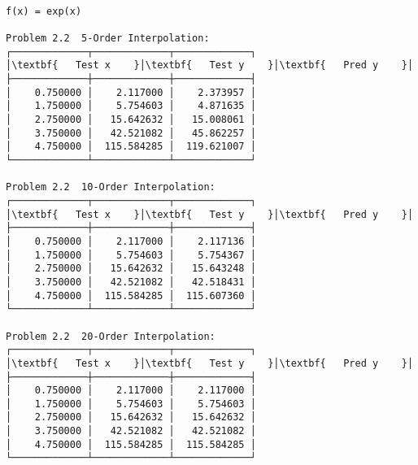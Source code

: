 \documentclass[11pt]{article}
\begin{document}
    \begin{center}
    \end{center}
    { \hspace*{\fill} \\}
    
    \begin{center}
    \end{center}
    { \hspace*{\fill} \\}
    
    \begin{center}
    \end{center}
    { \hspace*{\fill} \\}
    
    \begin{Verbatim}[commandchars=\\\{\}]
f(x) = exp(x)

Problem 2.2  5-Order Interpolation:
┌─────────────┬─────────────┬─────────────┐
│\textbf{   Test x    }│\textbf{   Test y    }│\textbf{   Pred y    }│
├─────────────┼─────────────┼─────────────┤
│    0.750000 │    2.117000 │    2.373957 │
│    1.750000 │    5.754603 │    4.871635 │
│    2.750000 │   15.642632 │   15.008061 │
│    3.750000 │   42.521082 │   45.862257 │
│    4.750000 │  115.584285 │  119.621007 │
└─────────────┴─────────────┴─────────────┘

Problem 2.2  10-Order Interpolation:
┌─────────────┬─────────────┬─────────────┐
│\textbf{   Test x    }│\textbf{   Test y    }│\textbf{   Pred y    }│
├─────────────┼─────────────┼─────────────┤
│    0.750000 │    2.117000 │    2.117136 │
│    1.750000 │    5.754603 │    5.754367 │
│    2.750000 │   15.642632 │   15.643248 │
│    3.750000 │   42.521082 │   42.518431 │
│    4.750000 │  115.584285 │  115.607360 │
└─────────────┴─────────────┴─────────────┘

Problem 2.2  20-Order Interpolation:
┌─────────────┬─────────────┬─────────────┐
│\textbf{   Test x    }│\textbf{   Test y    }│\textbf{   Pred y    }│
├─────────────┼─────────────┼─────────────┤
│    0.750000 │    2.117000 │    2.117000 │
│    1.750000 │    5.754603 │    5.754603 │
│    2.750000 │   15.642632 │   15.642632 │
│    3.750000 │   42.521082 │   42.521082 │
│    4.750000 │  115.584285 │  115.584285 │
└─────────────┴─────────────┴─────────────┘
    \end{Verbatim}
\end{document}
